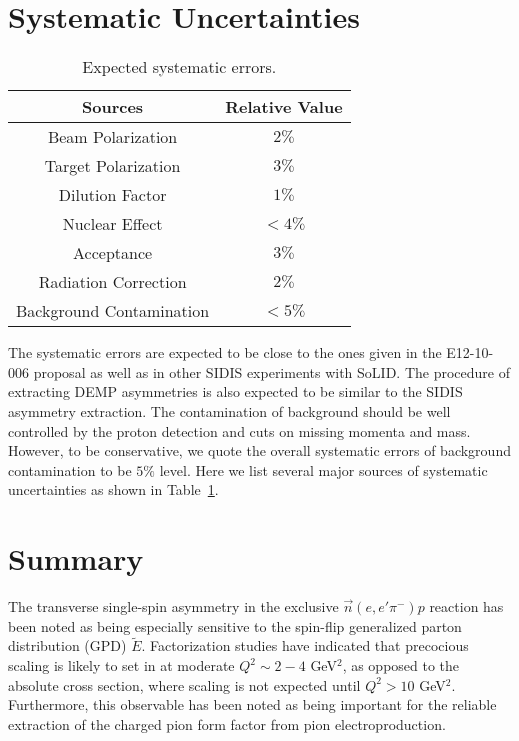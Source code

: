\documentclass{article}
\begin{document}
\newpage


\newpage


\section{Systematic Uncertainties}
\begin{table}[!htp]
\centering
\begin{tabular}{|c|c|}
\hline
{\bf Sources}            & {\bf Relative Value} \\\hline
Beam Polarization        & $2\%$ \\\hline 
Target Polarization      & $3\%$ \\\hline 
Dilution Factor            &  $1\%$ \\\hline 
Nuclear Effect             &  $<4\%$ \\\hline 
Acceptance               & $3\%$ \\\hline
Radiation Correction     & $2\%$ \\\hline
Background Contamination      & $<5\%$ \\\hline
\end{tabular}
\caption{\footnotesize{Expected systematic errors.}}\label{table:det_sys_err}
\end{table}
The systematic errors are expected to be close to the ones
given in the E12-10-006 proposal as well as in other SIDIS experiments with
SoLID. The procedure of extracting DEMP asymmetries is also expected to be similar to the SIDIS asymmetry extraction. 
The contamination of background should be well controlled by the proton detection and cuts on missing momenta and mass. 
However, to be conservative, we quote the overall systematic errors of background contamination to be $5\%$ level.
Here we list several major sources of systematic uncertainties as shown in Table~\ref{table:det_sys_err}.

\section{Summary}
The transverse single-spin asymmetry in the exclusive $\vec{n}(e,e'\pi^-)p$
reaction has been noted as being
especially sensitive to the spin-flip generalized parton distribution (GPD)
$\tilde{E}$.  Factorization studies have indicated that precocious scaling
is likely to set in at moderate $Q^2\sim 2-4$ GeV$^2$, as opposed to the
absolute cross section, where scaling is not expected until $Q^2>10$ GeV$^2$.
Furthermore, this observable has been noted as being important for the reliable
extraction of the charged pion form factor from pion electroproduction.
\end{document}
